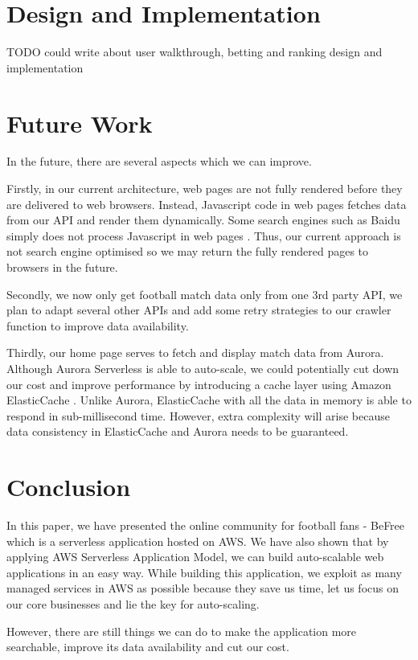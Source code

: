 \documentclass[conference]{IEEEtran}
\begin{document}
\section{Design and Implementation}
TODO could write about user walkthrough, betting and ranking design and implementation

\section{Future Work}
In the future, there are several aspects which we can improve.

Firstly, in our current architecture, web pages are not fully rendered before they are delivered to web browsers. Instead, Javascript code in web pages fetches data from our API and render them dynamically. Some search engines such as Baidu simply does not process Javascript in web pages \cite{b17}. Thus, our current approach is not search engine optimised so we may return the fully rendered pages to browsers in the future.

Secondly, we now only get football match data only from one 3rd party API, we plan to adapt several other APIs and add some retry strategies to our crawler function to improve data availability.

Thirdly, our home page serves to fetch and display match data from Aurora. Although Aurora Serverless is able to auto-scale, we could potentially cut down our cost and improve performance by introducing a cache layer using Amazon ElasticCache \cite{b18}. Unlike Aurora, ElasticCache with all the data in memory is able to respond in sub-millisecond time. However, extra complexity will arise because data consistency in ElasticCache and Aurora needs to be guaranteed.

\section{Conclusion}
In this paper, we have presented the online community for football fans - BeFree which is a serverless application hosted on AWS. We have also shown that by applying AWS Serverless Application Model, we can build auto-scalable web applications in an easy way. While building this application, we exploit as many managed services in AWS as possible because they save us time, let us focus on our core businesses and lie the key for auto-scaling.

However, there are still things we can do to make the application more searchable, improve its data availability and cut our cost.
\end{document}
